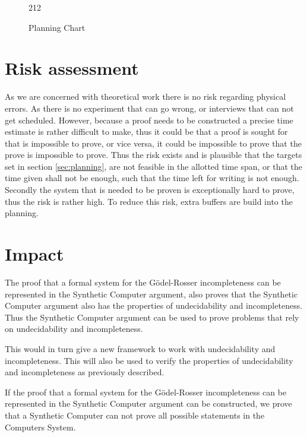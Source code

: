 \documentclass[a4paper]{scrartcl}
\begin{document}
\begin{figure}[H]
\begin{ganttproposal}{2}{12}

  \end{ganttproposal}
  \caption{Planning Chart}
  \label{fig:planning-chart}
\end{figure}

\section{Risk assessment}
\label{sec:risk-assessment}

As we are concerned with theoretical work there is no risk regarding physical errors. As there is no experiment that can go wrong, or interviews that can not get scheduled. However, because a proof needs to be constructed a precise time estimate is rather difficult to make, thus it could be that a proof is sought for that is impossible to prove, or vice versa, it could be impossible to prove that the prove is impossible to prove. Thus the risk exists and is plausible that the targets set in section \ref{sec:planning}, are not feasible in the allotted time span, or that the time given shall not be enough, such that the time left for writing is not enough. Secondly the system that is needed to be proven is exceptionally hard to prove, thus the risk is rather high. To reduce this risk, extra buffers are build into the planning. 

\section{Impact}
\label{sec:impact}
The proof that a formal system for the Gödel-Rosser incompleteness can be represented in the Synthetic Computer argument, also proves that the Synthetic Computer argument also has the properties of undecidability and incompleteness. Thus the Synthetic Computer argument can be used to prove problems that rely on undecidability and incompleteness. 

This would in turn give a new framework to work with undecidability and incompleteness. This will also be used to verify the properties of undecidability and incompleteness as previously described.

If the proof that a formal system for the Gödel-Rosser incompleteness can be represented in the Synthetic Computer argument can be constructed, we prove that a Synthetic Computer can not prove all possible statements in the Computers System. 

\newpage
\printbibliography
\end{document}
